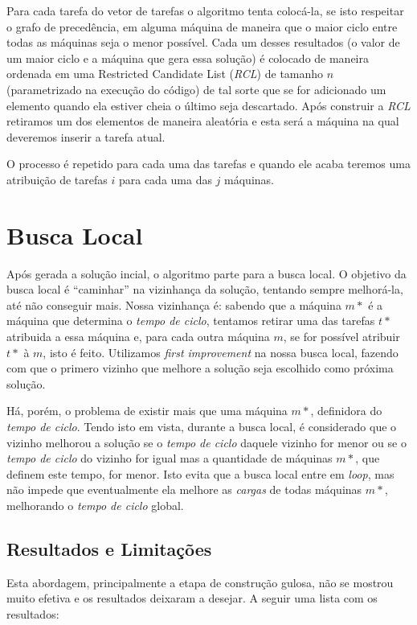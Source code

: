 \documentclass{report}
\begin{document}
{Para cada tarefa do vetor de tarefas o algoritmo tenta colocá-la, se
isto respeitar o grafo de precedência, em alguma
máquina de maneira que o maior ciclo entre todas as máquinas
seja o menor possível. Cada um desses resultados (o valor de um maior ciclo e
a máquina que gera essa solução)
é colocado de maneira ordenada em uma Restricted Candidate List (\emph{RCL})
de tamanho $n$ (parametrizado na execução do código)
de tal sorte que se for adicionado um elemento quando ela estiver
cheia o último seja descartado. Após construir a \emph{RCL} retiramos um dos
elementos de maneira aleatória e esta será a máquina na qual deveremos inserir
a tarefa atual.

O processo é repetido para cada uma das tarefas e quando ele acaba teremos
uma atribuição de tarefas $i$ para cada uma das $j$ máquinas.

\section{Busca Local}

Após gerada a solução incial, o algoritmo parte para a busca local.
O objetivo da busca local é ``caminhar'' na
vizinhança da solução, tentando sempre melhorá-la, até não conseguir mais.
Nossa vizinhança é: sabendo que a máquina $m*$
é a máquina que determina o \emph{tempo de ciclo},
tentamos retirar uma das tarefas $t*$ atribuida a essa máquina e, para cada
outra máquina $m$, se for possível atribuir $t*$ à $m$, isto é feito.
Utilizamos \textit{first improvement} na nossa busca
local, fazendo com que o primero vizinho que melhore a solução seja
escolhido como próxima solução.

Há, porém, o problema de existir mais que uma máquina $m*$,
definidora do \emph{tempo de ciclo}. Tendo isto em vista,
durante a busca local, é considerado que o vizinho melhorou a
solução se o \emph{tempo de ciclo} daquele vizinho for
menor ou se o \emph{tempo de ciclo} do vizinho for igual mas a
quantidade de máquinas $m*$, que definem este tempo, for
menor. Isto evita que a busca local entre em \emph{loop}, mas não impede que
eventualmente ela melhore as \emph{cargas} de
todas máquinas $m*$, melhorando o \emph{tempo de ciclo} global.

\subsection{Resultados e Limitações}

Esta abordagem, principalmente a etapa de construção gulosa, não se mostrou muito
efetiva e os resultados deixaram a desejar. A seguir uma lista com os resultados:

}
\end{document}
